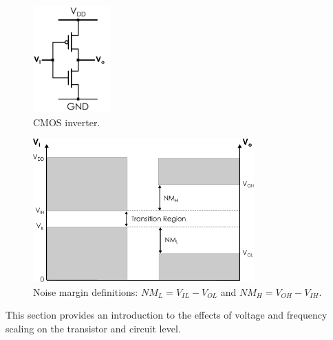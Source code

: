 \begin{figure}[htb]
    \centering
    \includegraphics[width=30mm]{Figures/Background/cmos_inverter.pdf}
    \caption{CMOS inverter.}
    \label{fig:cmos}
\end{figure}

\begin{figure}[htb]
    \centering
    \includegraphics[width=85mm]{Figures/Background/voltage_margin.pdf}
    \caption{Noise margin definitions: $NM_L=V_{IL}-V_{OL}$ and $NM_H=V_{OH}-V_{IH}$.}
    \label{fig:cmos_noise_margin}
\end{figure}

This section provides an introduction to the effects of voltage and frequency scaling on the transistor and circuit level.





